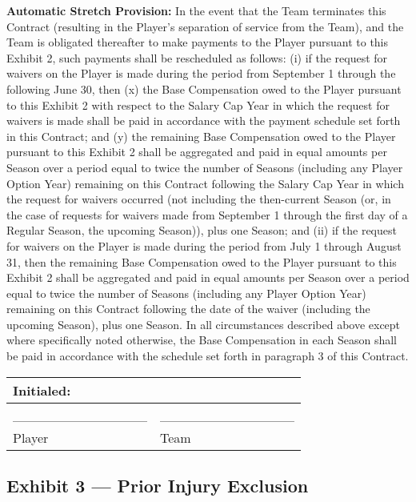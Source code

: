 \documentclass[
]{book}
\begin{document}
\textbf{Automatic Stretch Provision:} In the event that the Team terminates this Contract (resulting in the Player's separation of service from the Team), and the Team is obligated thereafter to make payments to the Player pursuant to this Exhibit 2, such payments shall be rescheduled as follows: (i) if the request for waivers on the Player is made during the period from September 1 through the following June 30, then (x) the Base Compensation owed to the Player pursuant to this Exhibit 2 with respect to the Salary Cap Year in which the request for waivers is made shall be paid in accordance with the payment schedule set forth in this Contract; and (y) the remaining Base Compensation owed to the Player pursuant to this Exhibit 2 shall be aggregated and paid in equal amounts per Season over a period equal to twice the number of Seasons (including any Player Option Year) remaining on this Contract following the Salary Cap Year in which the request for waivers occurred (not including the then-current Season (or, in the case of requests for waivers made from September 1 through the first day of a Regular Season, the upcoming Season)), plus one Season; and (ii) if the request for waivers on the Player is made during the period from July 1 through August 31, then the remaining Base Compensation owed to the Player pursuant to this Exhibit 2 shall be aggregated and paid in equal amounts per Season over a period equal to twice the number of Seasons (including any Player Option Year) remaining on this Contract following the date of the waiver (including the upcoming Season), plus one Season. In all circumstances described above except where specifically noted otherwise, the Base Compensation in each Season shall be paid in accordance with the schedule set forth in paragraph 3 of this Contract.

\begin{longtable}[]{@{}ll@{}}
\toprule()
Initialed: & \\
\midrule()
\endhead
\_\_\_\_\_\_\_\_\_\_\_\_\_\_ & \_\_\_\_\_\_\_\_\_\_\_\_\_\_ \\
Player & Team \\
\bottomrule()
\end{longtable}

\newpage

\hypertarget{exhibit-3-prior-injury-exclusion}{%
\subsection{Exhibit 3 --- Prior Injury Exclusion}\label{exhibit-3-prior-injury-exclusion}}
\end{document}
